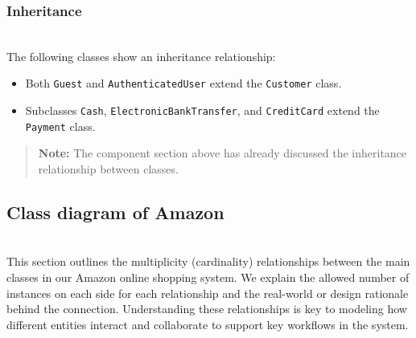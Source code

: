 \subsubsection{Inheritance}\label{spPUwOm3kRzPiqkKehu98-7}
\\
The following classes show an inheritance relationship:

\begin{itemize}
\item
\protect{}\label{OGb42QBkYAJ3_FBBVFKjh}
Both \texttt{Guest} and \texttt{AuthenticatedUser} extend the \texttt{Customer} class.
\item
\protect{}\label{KxxaeYiRvuMGLPKZn6sPp}
Subclasses \texttt{Cash}, \texttt{ElectronicBankTransfer}, and \texttt{CreditCard} extend the \texttt{Payment} class.
\end{itemize}
\begin{quote}
\textbf{Note:} The component section above has already discussed the inheritance relationship between classes.
\end{quote}
\subsection{Class diagram of Amazon}\label{ZxkKBEk4wlhTrTa_fE-oh}
\\
This section outlines the multiplicity (cardinality) relationships between the main classes in our Amazon online shopping system. We explain the allowed number of instances on each side for each relationship and the real-world or design rationale behind the connection. Understanding these relationships is key to modeling how different entities interact and collaborate to support key workflows in the system.

